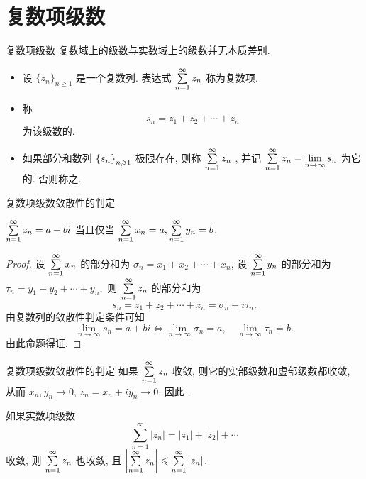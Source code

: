 \section{复数项级数}


\begin{frame}{复数项级数}
\onslide<+->
复数域上的级数与实数域上的级数并无本质差别.
\begin{definition}
\begin{itemize}
\item 设 $\{z_n\}_{n\ge1}$ 是一个复数列.
\onslide<+->
表达式 $\sum\limits_{n=1}^\infty z_n$ 称为复数项.
\item 称
\[s_n=z_1+z_2+\cdots+z_n\]
为该级数的.
\item 如果部分和数列 ${\left\{s_n\right\}}_{n\geqslant 1}$ 极限存在, 则称 $\sum\limits_{n=1}^\infty z_n$ , 并记 $\sum\limits_{n=1}^\infty z_n=\lim\limits_{n\to\infty}s_n$ 为它的.
\onslide<+->
否则称之.
\end{itemize}
\end{definition}
\end{frame}


\begin{frame}{复数项级数敛散性的判定}
\beqskip{8pt}
\begin{theorem}
$\sum\limits_{n=1}^\infty z_n=a+bi$ 当且仅当 $\sum\limits_{n=1}^\infty x_n=a,\sum\limits_{n=1}^\infty y_n=b$.
\end{theorem}
\begin{proof}
设 $\sum\limits_{n=1}^\infty x_n$ 的部分和为 $\sigma_n=x_1+x_2+\cdots+x_n$,
设 $\sum\limits_{n=1}^\infty y_n$ 的部分和为
$\tau_n=y_1+y_2+\cdots+y_n,$
\onslide<+->
则 $\sum\limits_{n=1}^\infty z_n$ 的部分和为
\[s_n=z_1+z_2+\cdots+z_n=\sigma_n+i\tau_n.\]
\onslide<+->
由复数列的敛散性判定条件可知
\[\lim_{n\to\infty}s_n=a+bi\iff	\lim_{n\to\infty}\sigma_n=a,\quad \lim_{n\to\infty}\tau_n=b.\]
\onslide<+->
由此命题得证.
\end{proof}
\endgroup
\end{frame}


\begin{frame}{复数项级数敛散性的判定}
\onslide<+->
如果 $\sum\limits_{n=1}^\infty z_n$ 收敛, 则它的实部级数和虚部级数都收敛,
\onslide<+->
从而 $x_n,y_n\to 0$,
\onslide<+->
$z_n=x_n+iy_n\to 0$.
\onslide<+->
因此 .
\begin{theorem}
如果实数项级数
\[\sum_{n=1}^\infty|z_n|=|z_1|+|z_2|+\cdots\]
收敛, 则 $\sum\limits_{n=1}^\infty z_n$ 也收敛, 且 $\left|\sum\limits_{n=1}^\infty z_n\right|\leqslant\sum\limits_{n=1}^\infty |z_n|$.
\end{theorem}
\end{frame}


